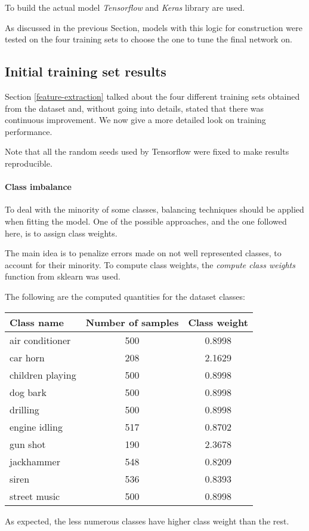 To build the actual model \emph{Tensorflow} and \emph{Keras} library 
are used.~\cite{tensorflow}~\cite{keras}

As discussed in the previous Section, models with this logic for 
construction were tested on the four training sets to choose the one to tune 
the final network on.

\subsection{Initial training set results}

Section \vref{feature-extraction} talked about the four different 
training sets obtained from the dataset and, without going into details, 
stated that there was continuous improvement. 
We now give a more detailed look on training performance.

Note that all the random seeds used by Tensorflow were fixed 
to make results reproducible.

\paragraph{Class imbalance}
To deal with the minority of some classes, balancing techniques should be 
applied when fitting the model. One of the possible approaches, and the one followed
here, is to assign class weights. 

The main idea is to penalize errors made on not well represented classes, to account 
for their minority. To compute class weights, the \emph{compute class weights} function
from sklearn was used.~\cite{classweight}

The following are the computed quantities for the dataset classes:
\begin{center}
    \begin{tabular}{ |l|c|c| } 
        \hline
        Class name & Number of samples & Class weight \\
        \hline
        air conditioner & 500 & 0.8998 \\
        car horn & 208 & 2.1629 \\
        children playing & 500 & 0.8998 \\
        dog bark & 500 & 0.8998 \\
        drilling & 500 & 0.8998 \\
        engine idling & 517 & 0.8702 \\
        gun shot & 190 & 2.3678 \\
        jackhammer & 548 & 0.8209 \\
        siren & 536 & 0.8393 \\
        street music & 500 & 0.8998 \\
        \hline
    \end{tabular}
\end{center}
As expected, the less numerous classes have higher class weight than the rest.

